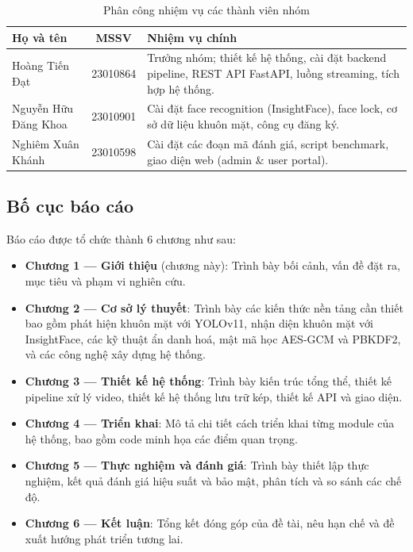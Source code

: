 \begin{table}[H]
\centering
\caption{Phân công nhiệm vụ các thành viên nhóm}
\label{tab:phancong}
{\small
\begin{tabularx}{\textwidth}{|l|c|X|}
\hline
\textbf{Họ và tên} & \textbf{MSSV} & \textbf{Nhiệm vụ chính} \\
\hline
Hoàng Tiến Đạt & 23010864 & Trưởng nhóm; thiết kế hệ thống, cài đặt backend pipeline, REST API FastAPI, luồng streaming, tích hợp hệ thống. \\
\hline
Nguyễn Hữu Đăng Khoa & 23010901 & Cài đặt face recognition (InsightFace), face lock, cơ sở dữ liệu khuôn mặt, công cụ đăng ký. \\
\hline
Nghiêm Xuân Khánh & 23010598 & Cài đặt các đoạn mã đánh giá, script benchmark, giao diện web (admin \& user portal). \\
\hline
\end{tabularx}
}
\end{table}

\subsection{Bố cục báo cáo}
\label{subsec:bocuc}

Báo cáo được tổ chức thành 6 chương như sau:

\begin{itemize}
    \item \textbf{Chương 1 --- Giới thiệu} (chương này): Trình bày bối cảnh, vấn đề đặt ra, mục tiêu và phạm vi nghiên cứu.
    
    \item \textbf{Chương 2 --- Cơ sở lý thuyết}: Trình bày các kiến thức nền tảng cần thiết bao gồm phát hiện khuôn mặt với YOLOv11, nhận diện khuôn mặt với InsightFace, các kỹ thuật ẩn danh hoá, mật mã học AES-GCM và PBKDF2, và các công nghệ xây dựng hệ thống.
    
    \item \textbf{Chương 3 --- Thiết kế hệ thống}: Trình bày kiến trúc tổng thể, thiết kế pipeline xử lý video, thiết kế hệ thống lưu trữ kép, thiết kế API và giao diện.
    
    \item \textbf{Chương 4 --- Triển khai}: Mô tả chi tiết cách triển khai từng module của hệ thống, bao gồm code minh họa các điểm quan trọng.
    
    \item \textbf{Chương 5 --- Thực nghiệm và đánh giá}: Trình bày thiết lập thực nghiệm, kết quả đánh giá hiệu suất và bảo mật, phân tích và so sánh các chế độ.
    
    \item \textbf{Chương 6 --- Kết luận}: Tổng kết đóng góp của đề tài, nêu hạn chế và đề xuất hướng phát triển tương lai.
\end{itemize}

\medskip
